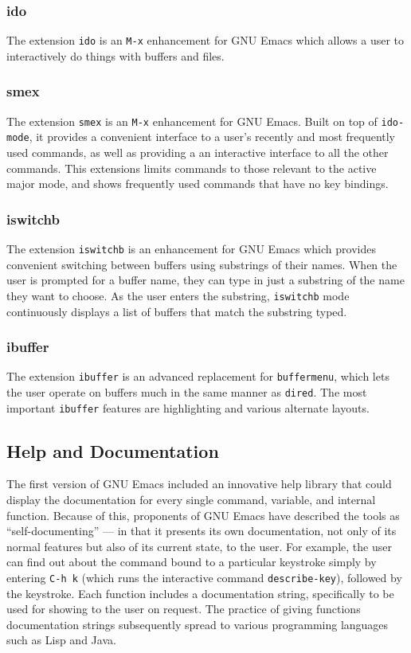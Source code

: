 \documentclass[12pt,a4paper,oneside]{article}
\begin{document}
\subsubsection{ido}
The extension \texttt{ido} is an \texttt{M-x} enhancement for GNU Emacs which allows a user to interactively do things with buffers and files.

\subsubsection{smex}
The extension \texttt{smex} is an \texttt{M-x} enhancement for GNU Emacs. Built on top of \texttt{ido-mode}, it provides a convenient interface to a user's recently and most frequently used commands, as well as providing a an interactive interface to all the other commands. This extensions limits commands to those relevant to the active major mode, and shows frequently used commands that have no key bindings.

\subsubsection{iswitchb}
The extension \texttt{iswitchb} is an enhancement for GNU Emacs which provides convenient switching between buffers using substrings of their names. When the user is prompted for a buffer name, they can type in just a substring of the name they want to choose. As the user enters the substring, \texttt{iswitchb} mode continuously displays a list of buffers that match the substring typed.

\subsubsection{ibuffer}
The extension \texttt{ibuffer} is an advanced replacement for \texttt{buffermenu}, which lets the user operate on buffers much in the same manner as \texttt{dired}. The most important \texttt{ibuffer} features are highlighting and various alternate layouts.

\subsection{Help and Documentation}
The first version of GNU Emacs included an innovative help library that could display the documentation for every single command, variable, and internal function. Because of this, proponents of GNU Emacs have described the tools as ``self-documenting'' — in that it presents its own documentation, not only of its normal features but also of its current state, to the user. For example, the user can find out about the command bound to a particular keystroke simply by entering \texttt{C-h k} (which runs the interactive command \texttt{describe-key}), followed by the keystroke. Each function includes a documentation string, specifically to be used for showing to the user on request. The practice of giving functions documentation strings subsequently spread to various programming languages such as Lisp and Java.\\
\end{document}
